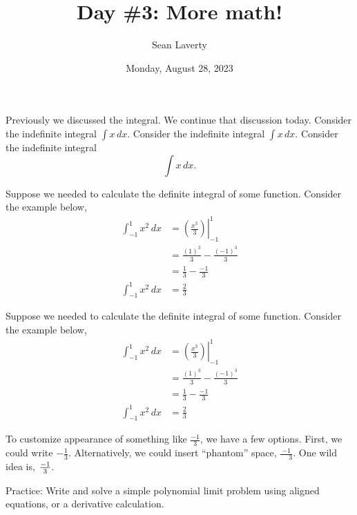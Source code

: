 \documentclass[landscape, 12pt]{article} %
\author{Sean Laverty}
\title{Day \#3: More math!} %
\date{Monday, August 28, 2023}
\begin{document}
\doublespacing %
\maketitle
\newpage

Previously we discussed the integral. We continue that discussion today.  Consider the indefinite integral \(\int x\,dx\).         Consider the indefinite integral \(\displaystyle \int x\,dx\).       Consider the indefinite integral \[\int x\,dx.\]

Suppose we needed to calculate the definite integral of some function.  Consider the example below,
\begin{align} %
\int_{-1}^{1} x^2\,dx &= \left.\left(\frac{x^3}{3}\right)\right|_{-1}^{1}\\
 &= \frac{(1)^3}{3} -  \frac{(-1)^3}{3}\\
 &= \frac{1}{3} -  \frac{-1}{3}\\
 \int_{-1}^{1} x^2\,dx &= \frac{2}{3}
\end{align}

Suppose we needed to calculate the definite integral of some function.  Consider the example below,
\begin{align*} %
\int_{-1}^{1} x^2\,dx &= \left.\left(\frac{x^3}{3}\right)\right|_{-1}^{1}\\
 &= \frac{(1)^3}{3} -  \frac{(-1)^3}{3}\\
%
 &= \frac{1}{3} -  \frac{-1}{3}\\
%
\int_{-1}^{1} x^2\,dx &= \frac{2}{3}
\end{align*}

To customize appearance of something like \(\frac{-1}{3}\), we have a few options.  First, we could write \(-\frac{1}{3}\).  Alternatively, we could insert ``phantom'' space, \(\frac{-1}{\phantom{-}3}\). One wild idea is, \(\frac{-1}{\hfill3\hfill}\). %

Practice: Write and solve a simple polynomial limit problem using aligned equations, or a derivative calculation.
\end{document}

